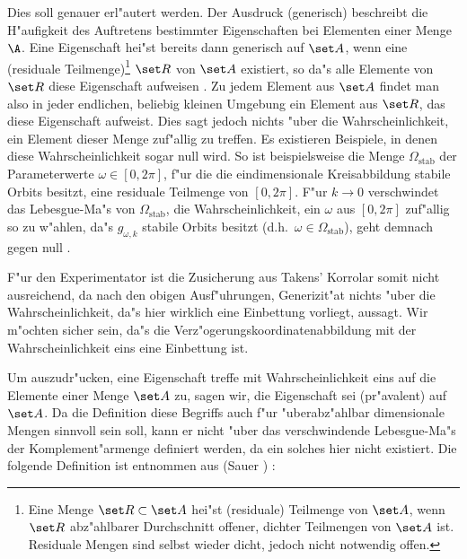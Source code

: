 Dies soll genauer erl"autert werden.  Der Ausdruck \naja(generisch) beschreibt die H"aufigkeit
des Auftretens bestimmter Eigenschaften bei Elementen einer Menge $\A$.
Eine \label{generisch} Eigenschaft hei"st bereits dann generisch auf $\set A$, wenn
eine \begriff(residuale Teilmenge)\footnote{Eine Menge $\set R\subset\set A$ hei"st
\begriff(residuale) Teilmenge von $\set A$, wenn $\set R$ abz"ahlbarer Durchschnitt
offener, dichter Teilmengen von $\set A$ ist. Residuale Mengen sind selbst wieder dicht, jedoch nicht notwendig offen. }
 $\set R$ von $\set A$ existiert, so
da"s alle Elemente von $\set R$ diese Eigenschaft aufweisen \cite{Liebert91}.
Zu jedem Element aus $\set A$ findet man also in
jeder endlichen, beliebig kleinen Umgebung ein Element aus $\set R$, das diese
Eigenschaft aufweist. Dies sagt jedoch nichts "uber die
Wahrscheinlichkeit, ein Element dieser Menge zuf"allig zu treffen. Es existieren Beispiele,
in denen diese Wahrscheinlichkeit sogar null wird. So ist beispielsweise
die Menge $\Omega_{\text{stab}}$ der Parameterwerte $\omega\in[0,2\pi]$, f"ur die die
eindimensionale Kreisabbildung
stabile Orbits besitzt, eine residuale Teilmenge von $[0,2\pi]$. F"ur $k\to0$ verschwindet
das Lebesgue-Ma"s von $\Omega_{\text{stab}}$, die Wahrscheinlichkeit, ein
$\omega$ aus $[0,2\pi]$ zuf"allig so zu w"ahlen, da"s $g_{\omega,k}$ stabile Orbits besitzt (d.h.\
$\omega\in\Omega_{\text{stab}}$), geht demnach gegen null \cite{Sauer91}.


F"ur den Experimentator ist die Zusicherung aus Takens' Korrolar somit nicht ausreichend,
da nach den obigen Ausf"uh\-rungen, Generizit"at nichts "uber die Wahrscheinlichkeit, da"s
hier wirklich eine Einbettung vorliegt, aussagt. Wir m"ochten sicher sein, da"s die
Verz"ogerungskoordinatenabbildung mit der Wahrscheinlichkeit eins eine Einbettung ist.

Um auszudr"ucken, eine Eigenschaft treffe mit Wahrscheinlichkeit eins auf die Elemente
einer Menge $\set A$ zu, sagen wir, die Eigenschaft sei \begriff(pr"avalent) auf $\set A$. 
Da die Definition diese Begriffs auch f"ur "uberabz"ahlbar dimensionale Mengen sinnvoll
sein soll, kann er nicht "uber das verschwindende Lebesgue-Ma"s der Komplement"armenge
definiert werden, da ein solches hier nicht existiert. Die folgende Definition ist
entnommen aus \autor(Sauer \etal) \cite{Sauer91}:

